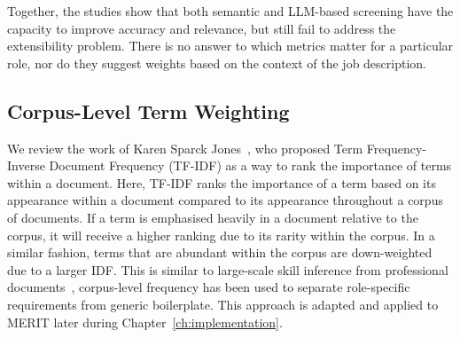 Together, the studies show that both semantic and LLM-based screening have the capacity to improve accuracy and 
relevance, but still fail to address the extensibility problem. There is no answer to which metrics matter for 
a particular role, nor do they suggest weights based on the context of the job description.

\subsection{Corpus-Level Term Weighting}
We review the work of Karen Sparck Jones~\cite{sparckjones1972idf}, who proposed Term Frequency-Inverse 
Document Frequency (TF-IDF) as a way to rank the importance of terms within a document. Here, TF-IDF ranks
the importance of a term based on its appearance within a document compared to its appearance throughout a 
corpus of documents. If a term is emphasised heavily in a document relative to the corpus, it will receive a 
higher ranking due to its rarity within the corpus. In a similar fashion, terms that are abundant within the
corpus are down-weighted due to a larger IDF. This is similar to large-scale skill inference from professional 
documents~\cite{bastian2014linkedin}, corpus-level frequency has been used to separate role-specific 
requirements from generic boilerplate. This approach is adapted and applied to MERIT later during Chapter~\ref{ch:implementation}.


